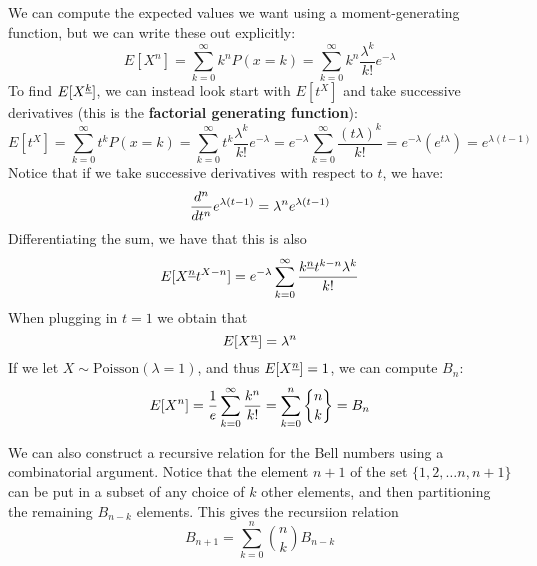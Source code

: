 \documentclass[11pt,twosided]{article}
\begin{document}
We can compute the expected values we want using a moment-generating function, but we can write these out explicitly: 
\[
E[X^n] = \sum_{k=0}^\infty k^n P(x=k) =  \sum_{k=0}^\infty k^n \frac{\lambda^k}{k!}e^{-\lambda}
\]
To find $E[X^{\underline{k}}]$, we can instead look start with $E[t^X]$ and take successive derivatives (this is the \textbf{factorial generating function}): 
\[
E[t^X] = \sum_{k=0}^\infty t^k P(x=k) =  \sum_{k=0}^\infty t^k \frac{\lambda^k}{k!}e^{-\lambda} = e^{-\lambda} \sum_{k=0}^\infty  \frac{(t\lambda)^k}{k!} = e^{-\lambda} (e^{t\lambda}) = e^{\lambda(t-1)}
\]
Notice that if we take successive derivatives with respect to $t$, we have: 
\[
	\frac{d^{n} }{d t^{n}} e^{\lambda(t-1)} = \lambda^n e^{\lambda(t-1)}
\]
Differentiating the sum, we have that this is also 
\[
	E[X^{\underline{n}} t^{X-n}] = e^{-\lambda} \sum_{k=0}^\infty  \frac{k^{\underline{n}} t^{k-n} \lambda^k}{k!} 
\]
When plugging in $t=1$ we obtain that 
\[
	E[X^{\underline{n}}] = \lambda^n
\]
If we let $X \sim \text{Poisson}(\lambda = 1)$, and thus $E[X^{\underline{n}}] = 1$, we can compute $B_n$: 
\[
	E[X^n] = \frac{1}{e}\sum_{k=0}^\infty \frac{k^n}{k!} =  \sum_{k=0}^n \dstirii{n}{k} = B_n
\]

We can also construct a recursive relation for the Bell numbers using a combinatorial argument. Notice that the element $n+1$ of the set $\{1, 2, \ldots n, n+1\}$ can be put in a subset of any choice of $k$ other elements, and then partitioning the remaining $B_{n-k}$ elements. This gives the recursiion relation
\[
	B_{n+1} = \sum_{k=0}^n \binom{n}{k} B_{n-k}
\]
\end{document}
